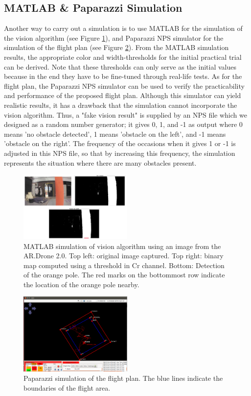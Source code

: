 \subsection{MATLAB \& Paparazzi Simulation}
Another way to carry out a simulation is to use MATLAB for the simulation of the vision algorithm (see Figure \ref{matlab}), and Paparazzi NPS simulator for the simulation of the flight plan (see Figure \ref{paparazzi_sim}). From the MATLAB simulation results, the appropriate color and width-thresholds for the initial practical trial can be derived. Note that these thresholds can only serve as the initial values because in the end they have to be fine-tuned through real-life tests. As for the flight plan, the Paparazzi NPS simulator can be used to verify the practicability and performance of the proposed flight plan. Although this simulator can yield realistic results, it has a drawback that the simulation cannot incorporate the vision algorithm. Thus, a "fake vision result" is supplied by an NPS file which we designed as a random number generator; it gives 0, 1, and -1 as output where 0 means 'no obstacle detected', 1 means 'obstacle on the left', and -1 means 'obstacle on the right'. The frequency of the occasions when it gives 1 or -1 is adjusted in this NPS file, so that by increasing this frequency, the simulation represents the situation where there are many obstacles present.
\begin{figure}[h]
	\centering
	\includegraphics[width = 0.5\textwidth]{Figures/matlab.jpg}
	\caption{MATLAB simulation of vision algorithm using an image from the AR.Drone 2.0. Top left: original image captured. Top right: binary map computed using a threshold in Cr channel. Bottom: Detection of the orange pole. The red marks on the bottommost row indicate the location of the orange pole nearby.}
	\label{matlab}
\end{figure}
\begin{figure}[h]
	\centering
	\includegraphics[width = 0.5\textwidth]{Figures/paparazzi_sim.png}
	\caption{Paparazzi simulation of the flight plan. The blue lines indicate the boundaries of the flight area.}
	\label{paparazzi_sim}
\end{figure}